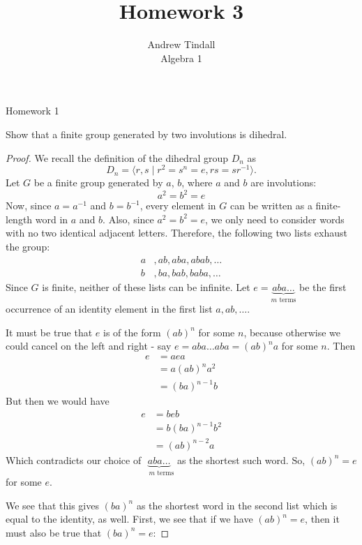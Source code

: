 \documentclass[12pt]{article}
\theoremstyle{definition}
\newenvironment{problem}[2][Problem]{\begin{trivlist}
\item[\hskip \labelsep {\bfseries #1}\hskip \labelsep {\bfseries #2.}]}{\end{trivlist}}
\begin{document}
 
 
\title{Homework 3}
\author{Andrew Tindall\\
Algebra 1}
 
\maketitle
\begin{section}{Homework 1}
\begin{problem}{1}
	Show that a finite group generated by two involutions is dihedral.
	\begin{proof}
		We recall the definition of the dihedral group $D_n$ as
		\[D_n = \langle r, s \mid r^2 = s^n = e, rs = sr^{-1}\rangle.\]
		Let $G$ be a finite group generated by $a$, $b$, where $a$ and $b$ are involutions: 
		\[a^2 = b^2 = e\]
		Now, since $a = a^{-1}$ and $b = b^{-1}$, every element in $G$ can be written as a finite-length word in $a$ and $b$. Also, since $a^2 = b^2 = e$, we only need to consider words with no two identical adjacent letters. Therefore, the following two lists exhaust the group:
		\begin{align*}
			a&, ab, aba, abab, \dots\\
			b&, ba, bab, baba, \dots
		\end{align*}
		Since $G$ is finite, neither of these lists can be infinite. Let $e = \underbrace{aba\dots}_{\text{$m$ terms}} $ be the first occurrence of an identity element in the first list $a, ab, \dots$.
		\par It must be true that $e$ is of the form $(ab)^n$ for some $n$, because otherwise we could cancel on the left and right - say $e = aba\dots aba = (ab)^na$ for some $n$. Then 
		\begin{align*}
			e &= aea\\
			&= a(ab)^n a^2\\
			&= (ba)^{n-1}b
		\end{align*}
		But then we would have 
		\begin{align*}
			e &= beb\\
			&= b(ba)^{n-1}b^2\\
			&= (ab)^{n-2}a
		\end{align*}
		Which contradicts our choice of $\underbrace{aba\dots}_{\text{ $m$ terms}}$ as the shortest such word. So, $(ab)^{n} = e$ for some $e$.
		\par We see that this gives $(ba)^{n}$ as the shortest word in the second list which is equal to the identity, as well. First, we see that if we have $(ab)^n = e$, then it must also be true that $(ba)^n = e$:

\end{proof}
\end{problem}
\end{section}
\end{document}
